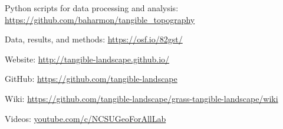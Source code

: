 \noindent
Python scripts for data processing and analysis: \\
\noindent
\url{https://github.com/baharmon/tangible_topography}

\noindent
Data, results, and methods: \url{https://osf.io/82gst/}

\noindent
Website: \url{http://tangible-landscape.github.io/}

\noindent
GitHub: \url{https://github.com/tangible-landscape}

\noindent
Wiki: \url{https://github.com/tangible-landscape/grass-tangible-landscape/wiki}

\noindent
Videos: \url{youtube.com/c/NCSUGeoForAllLab} 







